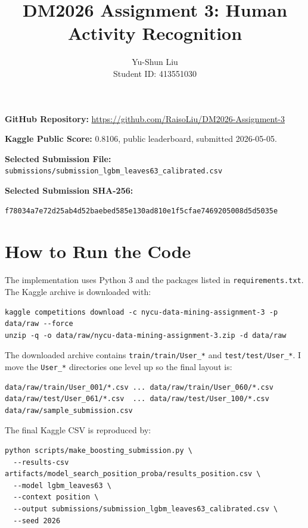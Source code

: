 \documentclass[11pt]{article}
\title{DM2026 Assignment 3: Human Activity Recognition}
\author{Yu-Shun Liu \\ Student ID: 413551030}
\date{}
\begin{document}
\maketitle

\noindent\textbf{GitHub Repository:} \url{https://github.com/RaisoLiu/DM2026-Assignment-3}

\noindent\textbf{Kaggle Public Score:} 0.8106, public leaderboard, submitted 2026-05-05.

\noindent\textbf{Selected Submission File:} \texttt{submissions/submission\_lgbm\_leaves63\_calibrated.csv}

\noindent\textbf{Selected Submission SHA-256:}
\begin{verbatim}
f78034a7e72d25ab4d52baebed585e130ad810e1f5cfae7469205008d5d5035e
\end{verbatim}

\section{How to Run the Code}

The implementation uses Python 3 and the packages listed in \texttt{requirements.txt}.
The Kaggle archive is downloaded with:

\begin{verbatim}
kaggle competitions download -c nycu-data-mining-assignment-3 -p data/raw --force
unzip -q -o data/raw/nycu-data-mining-assignment-3.zip -d data/raw
\end{verbatim}

The downloaded archive contains \texttt{train/train/User\_*} and
\texttt{test/test/User\_*}. I move the \texttt{User\_*} directories one level up
so the final layout is:

\begin{verbatim}
data/raw/train/User_001/*.csv ... data/raw/train/User_060/*.csv
data/raw/test/User_061/*.csv  ... data/raw/test/User_100/*.csv
data/raw/sample_submission.csv
\end{verbatim}

The final Kaggle CSV is reproduced by:

\begin{verbatim}
python scripts/make_boosting_submission.py \
  --results-csv artifacts/model_search_position_proba/results_position.csv \
  --model lgbm_leaves63 \
  --context position \
  --output submissions/submission_lgbm_leaves63_calibrated.csv \
  --seed 2026
\end{verbatim}
\end{document}
